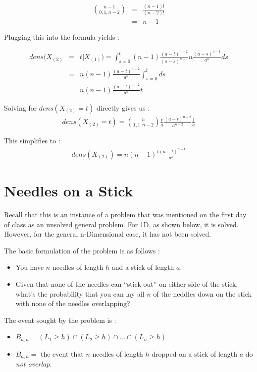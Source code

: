 \begin{eqnarray*}
{{n - 1} \choose {0, 1, n - 2}} &=& \frac {(n - 1)!}{(n - 2)!}\\
                                &=& n - 1
\end{eqnarray*}

Plugging this into the formula yields :

\begin{eqnarray*}
dens(X_{(2)} &=& t | X_{(1)}) = \int_{s = 0}^{t} (n - 1) \frac {(a-t)^{n - 2}}{(a - s)^{n - 1}} n \frac {(a - s)^{n - 1}}{a^n} ds\\
             &=& n(n - 1) \frac {(a - t)^{n - 2}}{a^n} \int_{s = 0}^{t} ds\\
             &=& n(n - 1) \frac {(a - t)^{n - 2}}{a^n} t
\end{eqnarray*}

Solving for $dens(X_{(2)} = t)$ directly gives us :
\begin{eqnarray*}
dens(X_{(2)} = t) = {{n} \choose {1, 1, n - 2}} \frac {t}{a} \frac {(a - t)^{n - 2}}{a^{n - 2}} \frac {1}{a}
\end{eqnarray*}

This simplifies to :
\begin{eqnarray*}
dens(X_{(2)}) = n(n-1) \frac{t(a-t)^{n-t}}{a^n}
\end{eqnarray*}

\section{Needles on a Stick}
Recall that this is an instance of a problem that was mentioned on the first day of class as an unsolved general problem.  For 1D, as shown below, it is solved.  However, for the general n-Dimensional case, it has not been solved.

The basic formulation of the problem is as follows :
\begin{itemize}
\item[]You have $n$ needles of length $h$ and a stick of length $a$.
\item[]Given that none of the needles can ``stick out'' on either side of the stick, what's the probability that you can lay all $n$ of the neddles down on the stick with none of the needles overlapping?
\end{itemize}

The event sought by the problem is :
\begin{itemize}
\item[]$B_{a, n} = (L_1 \geq h) \cap (L_2 \geq h) \cap \ldots \cap (L_n \geq h)$
\item[]$B_{a, n} = $ the event that $n$ needles of length $h$ dropped on a stick of length $a$ do \em not \em overlap.
\end{itemize}

